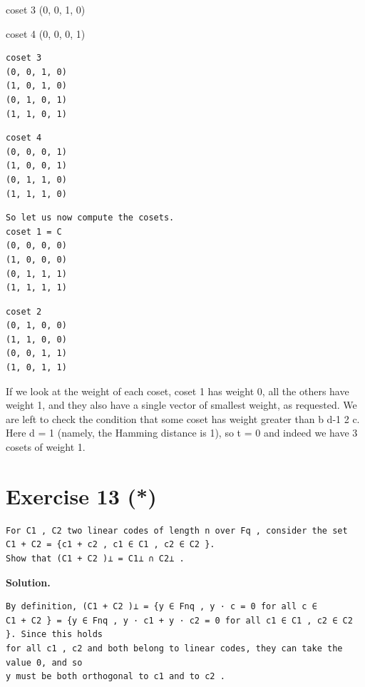 \documentclass[11pt]{article}
\begin{document}
\begin{solutionbox}
coset 3 (0, 0, 1, 0)

coset 4 (0, 0, 0, 1)

\begin{Verbatim}[fontsize=\small]
coset 3
(0, 0, 1, 0)
(1, 0, 1, 0)
(0, 1, 0, 1)
(1, 1, 0, 1)
\end{Verbatim}
\begin{Verbatim}[fontsize=\small]
coset 4
(0, 0, 0, 1)
(1, 0, 0, 1)
(0, 1, 1, 0)
(1, 1, 1, 0)
\end{Verbatim}
\begin{Verbatim}[fontsize=\small]
So let us now compute the cosets.
coset 1 = C
(0, 0, 0, 0)
(1, 0, 0, 0)
(0, 1, 1, 1)
(1, 1, 1, 1)
\end{Verbatim}
\begin{Verbatim}[fontsize=\small]
coset 2
(0, 1, 0, 0)
(1, 1, 0, 0)
(0, 0, 1, 1)
(1, 0, 1, 1)
\end{Verbatim}
If we look at the weight of each coset, coset 1 has weight 0, all the others have weight 1, and they also have a single vector of smallest weight, as requested. We are left to check the condition that some coset has weight greater than b d-1 2 c. Here d = 1 (namely, the Hamming distance is 1), so t = 0 and indeed we have 3 cosets of weight 1.

\end{solutionbox}
\section*{Exercise 13 (*)}
\begin{exercisebox}
\begin{Verbatim}[fontsize=\small]
For C1 , C2 two linear codes of length n over Fq , consider the set
C1 + C2 = {c1 + c2 , c1 ∈ C1 , c2 ∈ C2 }.
Show that (C1 + C2 )⊥ = C1⊥ ∩ C2⊥ .
\end{Verbatim}
\end{exercisebox}
\begin{solutionbox}
\textbf{Solution.}

\begin{Verbatim}[fontsize=\small]
By definition, (C1 + C2 )⊥ = {y ∈ Fnq , y · c = 0 for all c ∈
C1 + C2 } = {y ∈ Fnq , y · c1 + y · c2 = 0 for all c1 ∈ C1 , c2 ∈ C2 }. Since this holds
for all c1 , c2 and both belong to linear codes, they can take the value 0, and so
y must be both orthogonal to c1 and to c2 .
\end{Verbatim}
\end{solutionbox}
\end{document}
